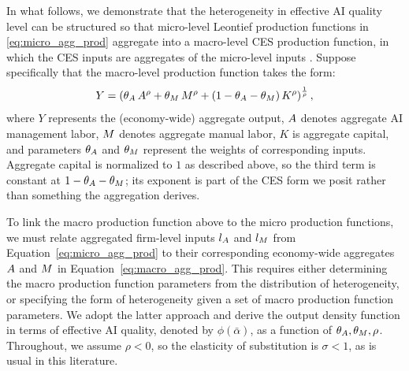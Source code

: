 In what follows, we demonstrate that the heterogeneity in effective AI quality level can be structured so that micro-level Leontief production functions in \eqref{eq:micro_agg_prod} aggregate into a macro-level CES production function, in which the CES inputs are aggregates of the micro-level inputs \citep{levhari1968note}.
Suppose specifically that the macro-level production function takes the form:
\begin{equation}
Y = \left(\theta_{A}\,A^{\rho}+\theta_{M}\,M^{\rho}+(1-\theta_{A}-\theta_{M})\,K^\rho\right)^{\frac{1}{\rho}},\label{eq:macro_agg_prod}
\end{equation}
where $Y$ represents the (economy-wide) aggregate output, $A$ denotes aggregate AI management labor, $M$ denotes aggregate manual labor, $K$ is aggregate capital, and parameters $\theta_{A}$ and $\theta_{M}$ represent the weights of corresponding inputs.
Aggregate capital is normalized to $1$ as described above, so the third term is constant at $1-\theta_{A}-\theta_{M}$; its exponent is part of the CES form we posit rather than something the aggregation derives.

To link the macro production function above to the micro production functions, we must relate aggregated firm-level inputs \( l_{A}\) and \( l_{M} \) from Equation~\eqref{eq:micro_agg_prod} to their corresponding economy-wide aggregates \( A\) and \( M \) in Equation~\eqref{eq:macro_agg_prod}.
This requires either determining the macro production function parameters from the distribution of heterogeneity, or specifying the form of heterogeneity given a set of macro production function parameters.
We adopt the latter approach and derive the output density function in terms of effective AI quality, denoted by \( \phi(\bar{\alpha}) \), as a function of \( \theta_{A}, \theta_{M}, \rho \).
Throughout, we assume $\rho<0$, so the elasticity of substitution is $\sigma<1$, as is usual in this literature.

